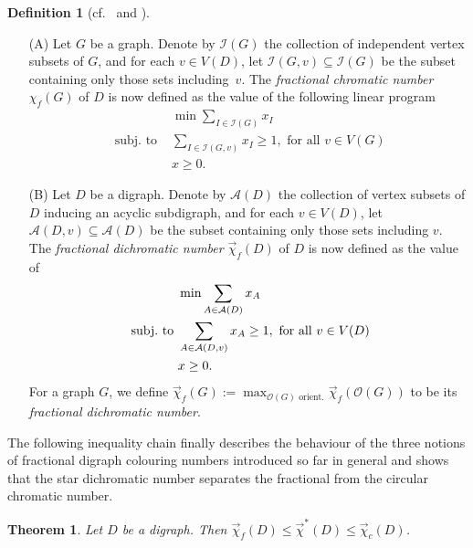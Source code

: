 \documentclass[fontsize=11pt,a4paper,DIV12]{scrartcl}
\theoremstyle{meiner}
\newtheorem{theorem}{Theorem}
\theoremstyle{definition}
\newtheorem{definition}{Definition}
\begin{document}
 \pagebreak[3]
\begin{definition}[cf.\ \cite{kneser} and \cite{frdichr}] \noindent
\begin{itemize}
\item[(A)] Let $G$ be a graph. Denote by $\mathcal{I}(G)$ the collection of independent vertex subsets of $G$, and for each $v \in V(D)$, let $\mathcal{I}(G,v) \subseteq \mathcal{I}(G)$ be the subset containing only those sets including~$v$.  The \emph{fractional chromatic number} $\chi_f(G)$ of $D$ is now defined as the value of the following linear program
\begin{align}
&\min \sum_{I \in \mathcal{I}(G)}{x_I}\\ 
\text{ subj.\ to }&
\sum_{I \in \mathcal{I}(G,v)}{x_I} \ge 1, \text{ for all } v \in V(G) \nonumber\\
& x \ge 0.\nonumber
\end{align}
\item[(B)] 
  Let $D$ be a digraph. Denote by $\mathcal{A}(D)$ the collection of
  vertex subsets of $D$ inducing an acyclic subdigraph, and for each
  $v \in V(D)$, let $\mathcal{A}(D,v) \subseteq \mathcal{A}(D)$ be the
  subset containing only those sets including $v$.  The
  \emph{fractional dichromatic number} $\vec{\chi}_f(D)$ of $D$ is now
  defined as the value of 
 \begin{align} \label{primal}
&\min \sum_{A \in \mathcal{A}(D)}{x_A}\\
\text{  subj.\ to }&
\sum_{A \in \mathcal{A}(D,v)}{x_A} \ge 1, \text{ for all } v \in V(D) \cr
& x \ge 0.\nonumber
\end{align}
For a graph $G$, we define $\vec{\chi}_f(G):=\max_{\mathcal{O}(G) \text{ orient.}}{\vec{\chi}_f(\mathcal{O}(G))}$ to be its \emph{fractional dichromatic number}.
\end{itemize}
\end{definition}
The following inequality chain finally describes the behaviour of the
three notions of fractional digraph colouring numbers introduced so
far in general and shows that the star dichromatic number separates
the fractional from the circular chromatic number.
\begin{theorem}\label{3Inequ}
Let $D$ be a digraph. Then $\vec{\chi}_f(D) \leq \vec{\chi}^\ast(D) \leq \vec{\chi}_c(D)$.
\end{theorem}
\end{document}
